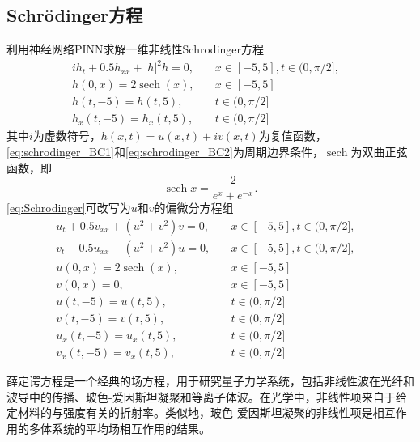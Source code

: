 \documentclass[addpoints,answers]{exam}
\DeclareMathOperator{\sech}{sech}
\begin{document}
   \subsection{Schr\"odinger方程} 利用神经网络PINN求解一维非线性Schrodinger方程  
  \begin{subequations}\label{eq:Schrodinger}
    \begin{align}
      i h_t + 0.5 h_{xx} + |h|^2h = 0, & \quad  x\in[-5,5],   t\in (0,\pi/2], \label{eq:schrodinger_ODE}\\
        h(0,x) = 2 \sech (x), & \quad x \in [-5,5] & \label{eq:schrodinger_IC}\\
        h(t,-5) = h(t, 5), & \quad t\in (0,\pi/2] \label{eq:schrodinger_BC1}\\
          h_x(t,-5) = h_x(t, 5), & \quad t\in (0,\pi/2] \label{eq:schrodinger_BC2}
    \end{align}
  \end{subequations}
  其中$i$为虚数符号，$h(x,t) = u(x,t) + i v(x,t)$为复值函数，\eqref{eq:schrodinger_BC1}和\eqref{eq:schrodinger_BC2}为周期边界条件，$\sech$为双曲正弦函数，即
  $$
  \sech x = \frac{2}{e^x + e^{-x}}.
  $$
  \eqref{eq:Schrodinger}可改写为$u$和$v$的偏微分方程组
  \begin{subequations}\label{eq:Schrodinger_uv}
    \begin{align}
      u_t + 0.5 v_{xx} + (u^2+v^2)v = 0,  & \quad  x\in[-5,5],   t\in (0,\pi/2], \label{eq:schrodinger_ODE_u}\\
        v_t - 0.5 u_{xx} - (u^2+v^2)u = 0, & \quad  x\in[-5,5],   t\in (0,\pi/2], \label{eq:schrodinger_ODE_v}\\
          u(0,x) = 2 \sech (x), & \quad x \in [-5,5] & \label{eq:schrodinger_IC_u}\\
          v(0,x) = 0, & \quad x \in [-5,5] & \label{eq:schrodinger_IC_v}\\
          u(t,-5) = u(t, 5), & \quad t\in (0,\pi/2] \label{eq:schrodinger_BC1_u}\\
            v(t,-5) = v(t, 5), & \quad t\in (0,\pi/2] \label{eq:schrodinger_BC1_v}\\
              u_x(t,-5) = u_x(t, 5), & \quad t\in (0,\pi/2] \label{eq:schrodinger_BC2_u}\\
               v_x(t,-5) = v_x(t, 5), & \quad t\in (0,\pi/2] \label{eq:schrodinger_BC2_v}
    \end{align}
  \end{subequations}

  \begin{remark}
    薛定谔方程是一个经典的场方程，用于研究量子力学系统，包括非线性波在光纤和波导中的传播、玻色-爱因斯坦凝聚和等离子体波。在光学中，非线性项来自于给定材料的与强度有关的折射率。类似地，玻色-爱因斯坦凝聚的非线性项是相互作用的多体系统的平均场相互作用的结果。
  \end{remark}
\end{document}

